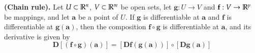 \begin{theorem}
  \textbf{(Chain rule).} Let $U\subset \mathbb{R}^n$, $V\subset \mathbb{R}^m$ be open sets, let $\bm{g} : U \to V$ and $\textbf{f} : V \to \mathbb{R}^p$ be mappings, and let $\bm{a}$ be a point of $U$. If $\bm{g}$ is differentiable at $\bm{a}$ and $\bm{f}$ is differentiable at $\bm{g}(\bm{a})$, then the composition $\bm{f} \circ \bm{g}$ is differentiable at $\bm{a}$, and its derivative is given by
  \begin{equation}
  	\bm{D}[(\bm{f}\circ \bm{g})(\bm{a})]=[\bm{Df} (\bm{g}(\bm{a}))]\circ [\bm{Dg}(\bm{a})]
  \end{equation}
\end{theorem}
